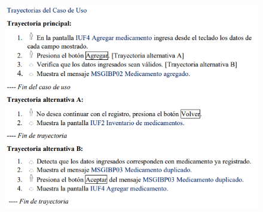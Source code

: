 \documentclass[12pt,letterpaper]{article}
\begin{document}
            \begin{figure}[H]
                \centering
                \includegraphics [scale=0.9]{specs/trayAgregarMedicamento}
            \end{figure}
\end{document}
